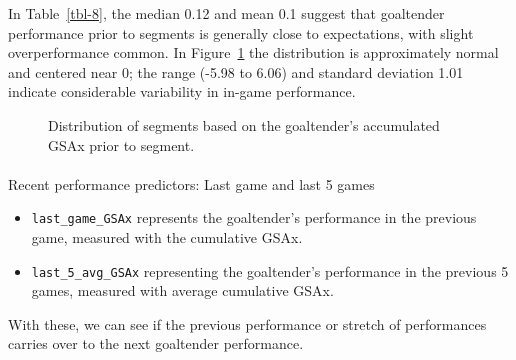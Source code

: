 \documentclass[
  letterpaper,
  DIV=11,
  numbers=noendperiod]{scrartcl}
\makeatletter
\let\oldparagraph\paragraph
\renewcommand{\paragraph}{
    \@ifstar
      \xxxParagraphStar
      \xxxParagraphNoStar
  }
\newcommand{\xxxParagraphStar}[1]{\oldparagraph*{#1}\mbox{}}
\newcommand{\xxxParagraphNoStar}[1]{\oldparagraph{#1}\mbox{}}
\providecommand{\tightlist}{%
  \setlength{\itemsep}{0pt}\setlength{\parskip}{0pt}}\usepackage{longtable,booktabs,array}
\makeatother
\begin{document}
In Table~\ref{tbl-8}, the median 0.12 and mean 0.1 suggest that
goaltender performance prior to segments is generally close to
expectations, with slight overperformance common. In Figure~\ref{fig-6}
the distribution is approximately normal and centered near 0; the range
(-5.98 to 6.06) and standard deviation 1.01 indicate considerable
variability in in-game performance.

\begin{figure}


\caption{\label{fig-6}Distribution of segments based on the goaltender's
accumulated GSAx prior to segment.}

\end{figure}%

\paragraph{Recent performance predictors: Last game and last 5
games}\label{recent-performance-predictors-last-game-and-last-5-games}

\begin{itemize}
\tightlist
\item
  \texttt{last\_game\_GSAx} represents the goaltender's performance in
  the previous game, measured with the cumulative GSAx.
\item
  \texttt{last\_5\_avg\_GSAx} representing the goaltender's performance
  in the previous 5 games, measured with average cumulative GSAx.
\end{itemize}

With these, we can see if the previous performance or stretch of
performances carries over to the next goaltender performance.
\end{document}
